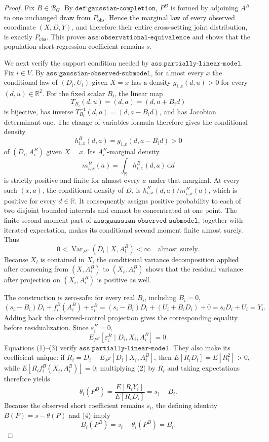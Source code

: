 \documentclass{article}
\begin{document}
\begin{proof}
Fix \(B\in\mathcal B_G\).  By \(\texttt{def:gaussian-completion}\), \(P^B\) is formed by adjoining \(A^B\) to one unchanged draw from \(P_{\mathrm{obs}}\).  Hence the marginal law of every observed coordinate \((X,D,Y)\), and therefore their entire cross-setting joint distribution, is exactly \(P_{\mathrm{obs}}\).  This proves \(\texttt{ass:observational-equivalence}\) and shows that the population short-regression coefficient remains \(s\).

We next verify the support condition needed by \(\texttt{ass:partially-linear-model}\).  Fix \(i\in V\).  By \(\texttt{ass:gaussian-observed-submodel}\), for almost every \(x\) the conditional law of \((D_i,U_i)\) given \(X=x\) has a density \(g_{i,x}(d,u)>0\) for every \((d,u)\in\mathbb R^2\).  For the fixed scalar \(B_i\), the linear map
\[
T_{B_i}(d,u)=(d,a)=(d,u+B_id)
\]
is bijective, has inverse \(T_{B_i}^{-1}(d,a)=(d,a-B_id)\), and has Jacobian determinant one.  The change-of-variables formula therefore gives the conditional density
\[
h_{i,x}^B(d,a)=g_{i,x}(d,a-B_id)>0
\]
of \((D_i,A_i^B)\) given \(X=x\).  Its \(A_i^B\)-marginal density
\[
m_{i,x}^B(a)=\int_{\mathbb R}h_{i,x}^B(d,a)\,\mathrm d d
\]
is strictly positive and finite for almost every \(a\) under that marginal.  At every such \((x,a)\), the conditional density of \(D_i\) is \(h_{i,x}^B(d,a)/m_{i,x}^B(a)\), which is positive for every \(d\in\mathbb R\).  It consequently assigns positive probability to each of two disjoint bounded intervals and cannot be concentrated at one point.  The finite-second-moment part of \(\texttt{ass:gaussian-observed-submodel}\), together with iterated expectation, makes its conditional second moment finite almost surely.  Thus
\[
0<\operatorname{Var}_{P^B}(D_i\mid X,A_i^B)<\infty
\quad\text{almost surely}. \tag{1}
\]
Because \(X_i\) is contained in \(X\), the conditional variance decomposition applied after coarsening from \((X,A_i^B)\) to \((X_i,A_i^B)\) shows that the residual variance after projection on \((X_i,A_i^B)\) is positive as well.

The construction is zero-safe: for every real \(B_i\), including \(B_i=0\),
\[
(s_i-B_i)D_i+f_i^B(A_i^B)+\varepsilon_i^B
=(s_i-B_i)D_i+(U_i+B_iD_i)+0
=s_iD_i+U_i=Y_i. \tag{2}
\]
Adding back the observed-control projection gives the corresponding equality before residualization.  Since \(\varepsilon_i^B=0\),
\[
E_{P^B}[\varepsilon_i^B\mid D_i,X_i,A_i^B]=0. \tag{3}
\]
Equations (1)--(3) verify \(\texttt{ass:partially-linear-model}\).  They also make its coefficient unique: if \(R_i=D_i-E_{P^B}[D_i\mid X_i,A_i^B]\), then \(E[R_iD_i]=E[R_i^2]>0\), while \(E[R_if_i^B(X_i,A_i^B)]=0\); multiplying (2) by \(R_i\) and taking expectations therefore yields
\[
\theta_i(P^B)=\frac{E[R_iY_i]}{E[R_iD_i]}=s_i-B_i. \tag{4}
\]
Because the observed short coefficient remains \(s_i\), the defining identity \(B(P)=s-\theta(P)\) and (4) imply
\[
B_i(P^B)=s_i-\theta_i(P^B)=B_i. \tag{5}
\]


\end{proof}
\end{document}
